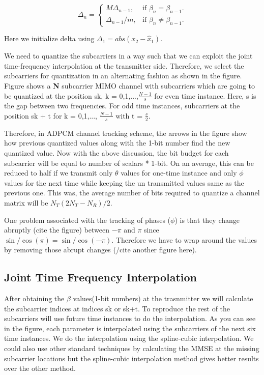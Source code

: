 \documentclass[conference]{IEEEtran}
\begin{document}
\begin{equation}
\label{delta_eqn}
\Delta_{n} = \begin{cases}
    M \Delta_{n-1}, & \text{if $\beta_{n} = \beta_{n-1}$}.\\
    \Delta_{n-1}/m , & \text{if $\beta_{n} \neq \beta_{n-1}$}.
  \end{cases}
\end{equation}

Here we initialize delta using $\Delta_1 = abs(x_{2}-\hat{x}_1)$.

We need to quantize the subcarriers in a way such that we can exploit
the joint time-frequency interpolation at the transmitter
side. Therefore, we select the subcarriers for quantization in an
alternating fashion as shown in the figure. Figure shows a \textbf{N}
subcarrier MIMO channel with subcarriers which are going to be
quantized at the position sk, k = 0,1,...,$\frac{N-1}{s}$ for even
time instance. Here, s is the gap between two frequencies. For odd
time instances, subcarriers at the position sk + t for k = 0,1,...,
$\frac{N-1}{s}$ with t = ${\frac{s}{2}}$.

Therefore, in ADPCM channel tracking scheme, the arrows in the figure show how previous quantized values along with the 1-bit number find the new quantized value. Now with the above discussion, the bit budget for each subcarrier will be equal to number of scalars * 1-bit. On an average, this can be reduced to half if we transmit only $\theta$ values for one-time instance and only $\phi$ values for the next time while keeping the un transmitted values same as the previous one. This was, the average number of bits required to quantize a channel matrix will be $N_{T}(2N_{T} - N_{R})/2$.

One problem associated with the tracking of phases ($\phi$) is that they change abruptly (cite the figure) between $-\pi$ and $\pi$ since $\sin/\cos(\pi) =\sin/\cos(-\pi)$. Therefore we have to wrap around the values by removing those abrupt changes (/cite another figure here).


\subsection{Joint Time Frequency Interpolation}
\label{interp}

After obtaining the $\beta$ values(1-bit numbers) at the trasnmitter we will calculate the subcarrier indices at indices sk or sk+t. To reproduce the rest of the subcarriers will use future time instances to do the interpolation. As you can see in the figure, each parameter is interpolated using the subcarriers of the next six time instances. We do the interpolation using the spline-cubic interpolation. We could also use other standard techniques by calculating the MMSE at the missing subcarrier locations but the spline-cubic interpolation method gives better results over the other method.
\end{document}

